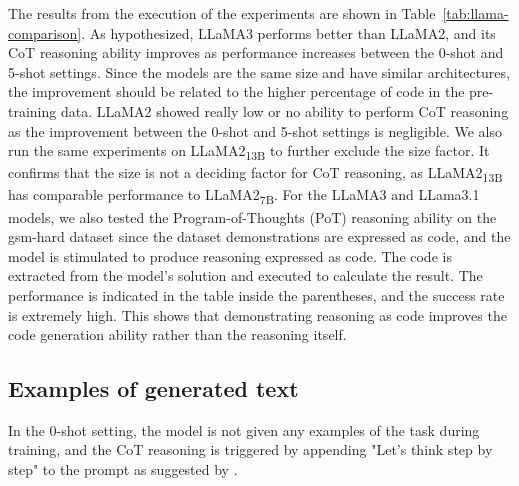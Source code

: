 The results from the execution of the experiments are shown in Table~\ref{tab:llama-comparison}.
As hypothesized, LLaMA3 performs better than LLaMA2, and its CoT reasoning ability improves as performance increases between the 0-shot and 5-shot settings.
Since the models are the same size and have similar architectures, the improvement should be related to the higher percentage of code in the pre-training data.
LLaMA2 showed really low or no ability to perform CoT reasoning as the improvement between the 0-shot and 5-shot settings is negligible.
We also run the same experiments on LLaMA2\textsubscript{13B} to further exclude the size factor.
It confirms that the size is not a deciding factor for CoT reasoning, as LLaMA2\textsubscript{13B} has comparable performance to LLaMA2\textsubscript{7B}.
For the LLaMA3 and LLama3.1 models, we also tested the Program-of-Thoughts (PoT) reasoning ability on the gsm-hard dataset since the dataset demonstrations are expressed as code, and the model is stimulated to produce reasoning expressed as code.
The code is extracted from the model's solution and executed to calculate the result.
The performance is indicated in the table inside the parentheses, and the success rate is extremely high. This shows that demonstrating reasoning as code improves the code generation ability rather than the reasoning itself.

\subsection{Examples of generated text}
\label{subsec:examples-of-generated-text}

In the 0-shot setting, the model is not given any examples of the task during training, and the CoT reasoning is triggered by appending "Let's think step by step" to the prompt as suggested by \textcite{kojima2023large}.\\

